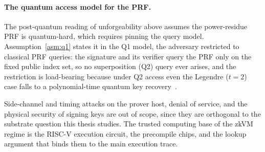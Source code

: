 \paragraph{The quantum access model for the PRF.}
The post-quantum reading of unforgeability above assumes the power-residue PRF is quantum-hard, which requires pinning the query model. Assumption~\ref{asm:q1} states it in the Q1 model, the adversary restricted to classical PRF queries: the signature and its verifier query the PRF only on the fixed public index set, so no superposition (Q2) query ever arises, and the restriction is load-bearing because under Q2 access even the Legendre ($t{=}2$) case falls to a polynomial-time quantum key recovery~\cite{vandamhallgrenip2006}.

Side-channel and timing attacks on the prover host, denial of service, and the physical security of signing keys are out of scope, since they are orthogonal to the substrate question this thesis studies. The trusted computing base of the zkVM regime is the RISC-V execution circuit, the precompile chips, and the lookup argument that binds them to the main execution trace.

